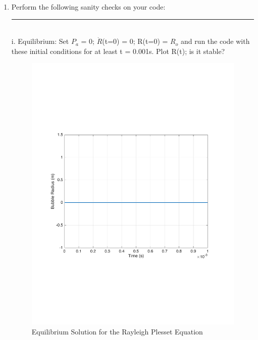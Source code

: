 \documentclass[12pt]{article}
\begin{document}
\begin{enumerate}
\newpage
\item Perform the following sanity checks on your code:\\
\noindent\rule{14cm}{0.4pt}\\
i. Equilibrium: Set $P_a$ = 0; $\dot{R}$(t=0) = 0; R(t=0) = $R_o$ and run the code with these initial conditions for at least t = 0.001s. Plot R(t); is it stable? 
\begin{figure}[h]
\includegraphics[scale = 0.4]{Fig_1}
\centering
\caption{Equilibrium Solution for the Rayleigh Plesset Equation}
\end{figure}


\end{enumerate}
\end{document}
